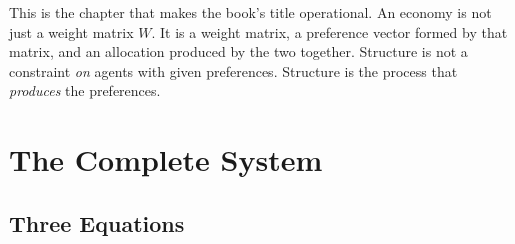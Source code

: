 \documentclass[../structural_economics_book.tex]{subfiles}
\begin{document}
This is the chapter that makes the book's title operational. An economy is not just a weight matrix $W$. It is a weight matrix, a preference vector formed by that matrix, and an allocation produced by the two together. Structure is not a constraint \textit{on} agents with given preferences. Structure is the process that \textit{produces} the preferences.


\section{The Complete System}
\label{ch10:sec:system}

\subsection{Three Equations}
\end{document}

